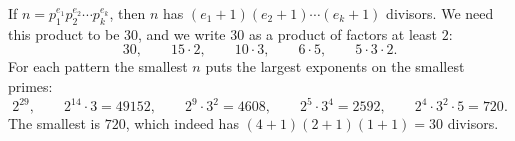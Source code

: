 If $n=p_1^{e_1}p_2^{e_2}\cdots p_k^{e_k}$, then $n$ has $(e_1+1)(e_2+1)\cdots(e_k+1)$ divisors. We need this product to be $30$, and we write $30$ as a product of factors at least $2$:
\[
30,\qquad 15\cdot2,\qquad 10\cdot3,\qquad 6\cdot5,\qquad 5\cdot3\cdot2 .
\]
For each pattern the smallest $n$ puts the largest exponents on the smallest primes:
\[
2^{29},\qquad 2^{14}\cdot3=49152,\qquad 2^9\cdot3^2=4608,\qquad 2^5\cdot3^4=2592,\qquad 2^4\cdot3^2\cdot5=720 .
\]
The smallest is $\boxed{720}$, which indeed has $(4+1)(2+1)(1+1)=30$ divisors.
